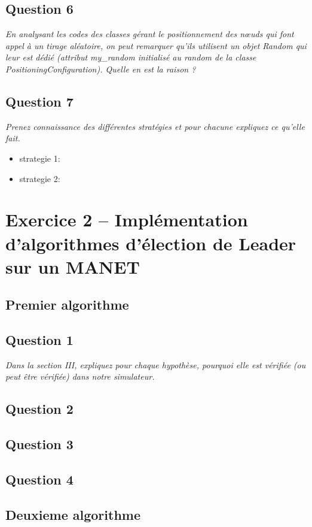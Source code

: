 \documentclass[11pt,a4paper,sans]{report}
\begin{document}
\section{Question 6}
\textit{En analysant les codes des classes gérant le positionnement des nœuds qui font appel à un tirage aléatoire, on peut remarquer qu’ils utilisent un objet Random qui leur est dédié (attribut my\_random initialisé au random de la classe PositioningConfiguration).  Quelle en est la raison ?}

\section{Question 7}
\textit{Prenez connaissance des différentes stratégies et pour chacune expliquez ce qu’elle fait.}
\begin{itemize}
\item strategie 1:
\item strategie 2:
\end{itemize}


\newpage
\chapter{Exercice 2 – Implémentation d’algorithmes d’élection de Leader sur un MANET}
\section*{Premier algorithme}

\section{Question 1}
\textit{Dans la section III, expliquez pour chaque hypothèse, pourquoi elle est vérifiée (ou
		peut être vérifiée) dans notre simulateur.}

\section{Question 2}

\section{Question 3}

\section{Question 4}

\section*{Deuxieme algorithme}
\end{document}
